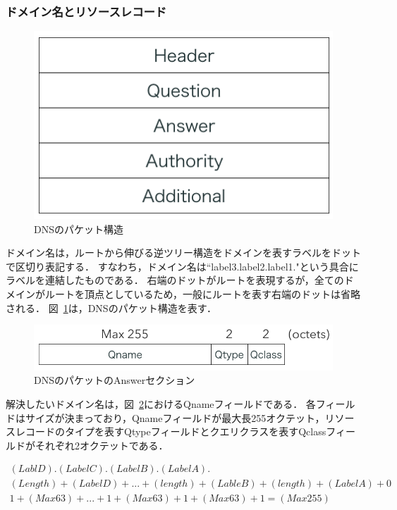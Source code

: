 \subsubsection{ドメイン名とリソースレコード}
\begin{figure}[h]
 \centering
 \includegraphics[scale=0.7]{figure/dns-format.png}
 \caption{DNSのパケット構造}
 \label{fig:dns-format}
\end{figure}

ドメイン名は，ルートから伸びる逆ツリー構造をドメインを表すラベルをドットで区切り表記する．
すなわち，ドメイン名は``label3.label2.label1."という具合にラベルを連結したものである．
右端のドットがルートを表現するが，全てのドメインがルートを頂点としているため，一般にルートを表す右端のドットは省略される．
図~\ref{fig:dns-format}は，DNSのパケット構造を表す．

\begin{figure}[h]
 \centering
 \includegraphics[scale=0.6]{figure/dns-answer.png}
 \caption{DNSのパケットのAnswerセクション}
 \label{fig:dns-answer}
\end{figure}

解決したいドメイン名は，図~\ref{fig:dns-answer}におけるQnameフィールドである．
各フィールドはサイズが決まっており，Qnameフィールドが最大長255オクテット，リソースレコードのタイプを表すQtypeフィールドとクエリクラスを表すQclassフィールドがそれぞれ2オクテットである．

\begin{eqnarray}
 (LablD).(LabelC).(LabelB).(LabelA). \label{eq:domain-name} \\
 (Length) + (LabelD) + ... + (length) + (LableB) + (length) + (LabelA) + 0 \label{eq:label-name} \\ 
 1 + (Max 63) + ... + 1 + (Max 63) + 1 + (Max 63) + 1 = (Max 255) \label{eq:length-label-domain}
\end{eqnarray}

